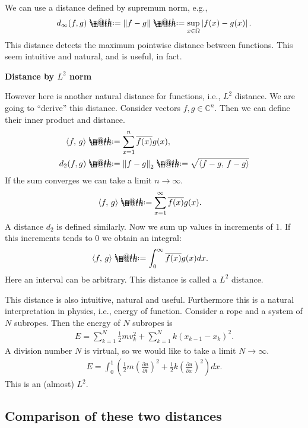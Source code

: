 \documentclass[openany, a4paper, oneside]{book}
\makeatletter
\newcommand*{\defeq}{\mathrel{\rlap{%
\raisebox{0.3ex}{$\m@th\cdot$}}%
\raisebox{-0.3ex}{$\m@th\cdot$}}%
=}
\theoremstyle{break}
\theoremstyle{breakdefn}
\newcommand{\abs}[1]{\left|#1\right|}
\newcommand{\norm}[1]{\left\Vert#1\right\Vert}
\newcommand{\rbk}[1]{\left (#1\right)}
\newcommand{\bkt}[2]{\left\langle#1,\,#2\right\rangle}
\newcommand{\bbC}{\mathbb{C}}
\makeatother
\begin{document}
We can use a distance defined by supremum norm, e.g.,
\begin{align}
 d_{\infty}(f, g)
 \defeq
 \norm{f - g}
 \defeq
 \sup_{x \in \Omega} \abs{f (x) - g (x)}.
\end{align}
This distance detects the maximum pointwise distance between functions.
This seem intuitive and natural, and is useful, in fact.

\vspace{1em}
\textbf{Distance by $L^2$ norm}

However here is another natural distance for functions, i.e., $L^2$ distance.
We are going to ``derive'' this distance.
Consider vectors $f, g \in \bbC^n$.
Then we can define their inner product and distance.
\begin{align}
 \bkt{f}{g}
 &\defeq
 \sum_{x=1}^{n} \overline{f (x)} g (x), \\
 d_2 (f, g)
 &\defeq
 \norm{f - g}_2
 \defeq
 \sqrt{\bkt{f-g}{f-g}}
\end{align}
If the sum converges we can take a limit $n \to \infty$.
\begin{align}
 \bkt{f}{g}
 &\defeq
 \sum_{x=1}^{\infty} \overline{f (x)} g (x).
\end{align}
A distance $d_2$ is defined similarly.
Now we sum up values in increments of 1.
If this increments tends to 0 we obtain an integral:
\begin{align}
 \bkt{f}{g}
 &\defeq
 \int_0^{\infty} \overline{f (x)} g (x) dx.
\end{align}
Here an interval can be arbitrary.
This distance is called a $L^2$ distance.

This distance is also intuitive, natural and useful.
Furthermore this is a natural interpretation in physics, i.e., energy of function.
Consider a rope and a system of $N$ subropes.
Then the energy of $N$ subropes is
\begin{align}
 E
 =
 \sum_{k=1}^{N} \frac{1}{2} m v_k^2 + \sum_{k=1}^{N} k (x_{k-1} - x_{k})^2.
\end{align}
A division number $N$ is virtual, so we would like to take a limit $N \to \infty$.
\begin{align}
 E
 =
 \int_0^1 \rbk{\frac{1}{2} m \rbk{\frac{\partial u}{\partial t}}^2 + \frac{1}{2} k \rbk{\frac{\partial u}{\partial x}}^2} dx.
\end{align}
This is an (almost) $L^2$.
\subsection{Comparison of these two distances}
\label{sec-7-1-1-4}
\end{document}
